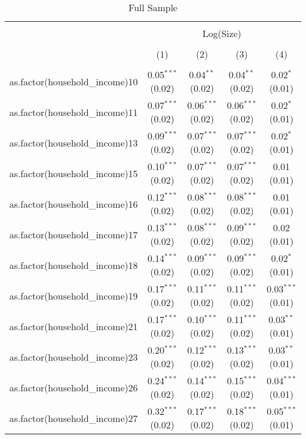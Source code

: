 
\begin{table}[!htbp] \centering 
  \caption{Full Sample} 
  \label{tab:packageSizeFullLiqAppendix} 
\begin{tabular}{@{\extracolsep{5pt}}lcccc} 
\\[-1.8ex]\hline 
\hline \\[-1.8ex] 
 & \multicolumn{4}{c}{Log(Size)} \\ 
\\[-1.8ex] & (1) & (2) & (3) & (4)\\ 
\hline \\[-1.8ex] 
 as.factor(household\_income)10 & 0.05$^{***}$ (0.02) & 0.04$^{**}$ (0.02) & 0.04$^{**}$ (0.02) & 0.02$^{*}$ (0.01) \\ 
  as.factor(household\_income)11 & 0.07$^{***}$ (0.02) & 0.06$^{***}$ (0.02) & 0.06$^{***}$ (0.02) & 0.02$^{*}$ (0.01) \\ 
  as.factor(household\_income)13 & 0.09$^{***}$ (0.02) & 0.07$^{***}$ (0.02) & 0.07$^{***}$ (0.02) & 0.02$^{*}$ (0.01) \\ 
  as.factor(household\_income)15 & 0.10$^{***}$ (0.02) & 0.07$^{***}$ (0.02) & 0.07$^{***}$ (0.02) & 0.01 (0.01) \\ 
  as.factor(household\_income)16 & 0.12$^{***}$ (0.02) & 0.08$^{***}$ (0.02) & 0.08$^{***}$ (0.02) & 0.01 (0.01) \\ 
  as.factor(household\_income)17 & 0.13$^{***}$ (0.02) & 0.08$^{***}$ (0.02) & 0.09$^{***}$ (0.02) & 0.02 (0.01) \\ 
  as.factor(household\_income)18 & 0.14$^{***}$ (0.02) & 0.09$^{***}$ (0.02) & 0.09$^{***}$ (0.02) & 0.02$^{*}$ (0.01) \\ 
  as.factor(household\_income)19 & 0.17$^{***}$ (0.02) & 0.11$^{***}$ (0.02) & 0.11$^{***}$ (0.02) & 0.03$^{***}$ (0.01) \\ 
  as.factor(household\_income)21 & 0.17$^{***}$ (0.02) & 0.10$^{***}$ (0.02) & 0.11$^{***}$ (0.02) & 0.03$^{**}$ (0.01) \\ 
  as.factor(household\_income)23 & 0.20$^{***}$ (0.02) & 0.12$^{***}$ (0.02) & 0.13$^{***}$ (0.02) & 0.03$^{**}$ (0.01) \\ 
  as.factor(household\_income)26 & 0.24$^{***}$ (0.02) & 0.14$^{***}$ (0.02) & 0.15$^{***}$ (0.02) & 0.04$^{***}$ (0.01) \\ 
  as.factor(household\_income)27 & 0.32$^{***}$ (0.02) & 0.17$^{***}$ (0.02) & 0.18$^{***}$ (0.02) & 0.05$^{***}$ (0.01) \\ 

\end{tabular}
\end{table}
